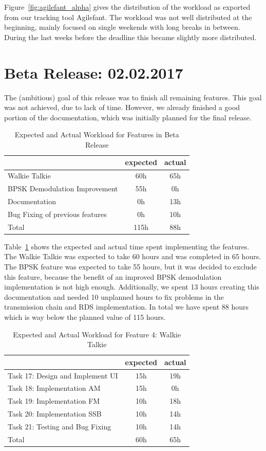 	Figure~\ref{fig:agilefant_alpha} gives the distribution of the workload as exported from our tracking tool Agilefant. The workload was not well distributed at the beginning, mainly focused on single weekends with long breaks in between. During the last weeks before the deadline this became slightly more distributed. 

\section{Beta Release: 02.02.2017}
The (ambitious) goal of this release was to finish all remaining features. This goal was not achieved, due to lack of time. However, we already finished a good portion of the documentation, which was initially planned for the final release. 

\begin{table}[!htbp]
	\centering
	\caption{Expected and Actual Workload for Features in Beta Release}
	\label{tab:beta:features}
	\begin{tabular}{ l | c | c }
		& expected  & actual \\ \hline
		Walkie Talkie & 60h & 65h \\  \hline
		BPSK Demodulation Improvement & 55h & 0h \\  \hline
		Documentation & 0h & 13h \\ \hline \hline
		Bug Fixing of previous features & 0h & 10h \\ \hline \hline 
		Total & 115h & 88h 
	\end{tabular}
\end{table}
Table~\ref{tab:beta:features} shows the expected and actual time spent implementing the features. The Walkie Talkie was expected to take 60 hours and was completed in 65 hours. The BPSK feature was expected to take 55 hours, but it was decided to exclude this feature, because the benefit of an improved BPSK demodulation implementation is not high enough. 
Additionally, we spent 13 hours creating this documentation and needed 10 unplanned hours to fix problems in the transmission chain and RDS implementation. In total we have spent 88 hours which is way below the planned value of 115 hours. 



	\begin{table}[!htbp]
	\centering
	\caption{Expected and Actual Workload for Feature 4: Walkie Talkie}
	\label{tab:alpha:feature4}
	\begin{tabular}{ l | c | c }
		& expected  & actual \\ \hline
		Task 17: Design and Implement UI& 15h & 19h \\ \hline
		Task 18: Implementation AM& 15h & 0h  \\ \hline
		Task 19: Implementation FM& 10h & 18h  \\ \hline
		Task 20: Implementation SSB& 10h & 14h \\ \hline 
		Task 21: Testing and Bug Fixing& 10h & 14h \\ \hline \hline
		Total & 60h & 65h
	\end{tabular}
\end{table}

